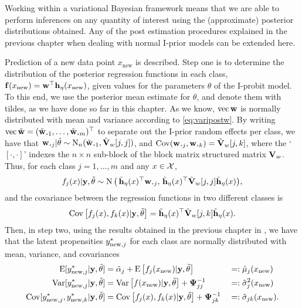 Working within a variational Bayesian framework means that we are able to perform inferences on any quantity of interest using the (approximate) posterior distributions obtained.
Any of the post estimation procedures explained in the previous chapter when dealing with normal I-prior models can be extended here.

Prediction of a new data point $x_{\text{new}}$ is described.
Step one is to determine the distribution of the posterior regression functions in each class, ${\mathbf f}(x_{\text{new}}) = {\mathbf w}^\top{\mathbf h}_\eta(x_{\text{new}})$, given values for the parameters $\theta$ of the I-probit model.
To this end, we use the posterior mean estimate for $\theta$, and denote them with tildes, as we have done so far in this chapter.
As we know, $\operatorname{vec}{\mathbf w}$ is normally distributed with mean and variance according to \cref{eq:varipostw}.
By writing $\vecc \tilde\bw = (\tilde \bw_{\bigcdot 1}, \dots, \tilde \bw_{\bigcdot m})^\top$ to separate out the I-prior random effects per class, we have that $\bw_{\bigcdot j}|\tilde\theta \sim \N_n(\tilde \bw_{\bigcdot 1}, \tilde\bV_w[j,j])$, and $\Cov(\bw_{\bigcdot j},\bw_{\bigcdot k}) = \tilde\bV_w[j,k]$, where the `$[\cdot,\cdot]$' indexes the $n\times n$ sub-block of the block matrix structured matrix ${\mathbf V}_w$.
Thus, for each class $j=1,\dots,m$ and any $x \in {\mathcal X}$,
\[
  f_j(x)|\by,\tilde\theta \sim \N\big(\,
  \tilde\bh_\eta(x)^\top\bw_{\bigcdot j}, \,
  \tilde\bh_\eta(x)^\top\tilde\bV_w[j,j]\tilde\bh_\eta(x)
  \big),
\]
and the covariance between the regression functions in two different classes is
\[
  \operatorname{Cov}\big[f_j(x),f_k(x)|{\mathbf y},\tilde\theta \big] = 
  \tilde{{\mathbf h}}_\eta(x)^\top \tilde{{\mathbf V}}_w[j,k] \tilde{{\mathbf h}}_\eta(x).
\]
Then, in step two, using the results obtained in the previous chapter in , we have that the latent propensities $y_{{\text{new}},j}^*$ for each class are normally distributed with mean, variance, and covariances
\begin{alignat*}{3}
  \operatorname{E}[y_{{\text{new}},j}^*|{\mathbf y},\tilde\theta]  
  &= \tilde\alpha_j + \operatorname{E} \big[ f_j(x_{\text{new}}) |{\mathbf y},\tilde\theta \big] 
  &&=: \hat\mu_j(x_\text{new}) \\
  \operatorname{Var}[y_{{\text{new}},j}^*|{\mathbf y},\tilde\theta] 
  &= \operatorname{Var}\big[f(x_{\text{new}})|{\mathbf y},\tilde\theta \big] + {\bm\Psi}^{-1}_{jj}
  &&=: \hat\sigma_j^2(x_\text{new}) \\
  \operatorname{Cov}[y_{{\text{new}},j}^*,y_{{\text{new}},k}^*|{\mathbf y},\tilde\theta] 
  &= \operatorname{Cov}\big[f_j(x),f_k(x)|{\mathbf y},\tilde\theta \big] + {\bm\Psi}^{-1}_{jk}
  &&=: \hat\sigma_{jk}(x_\text{new}).
\end{alignat*}

